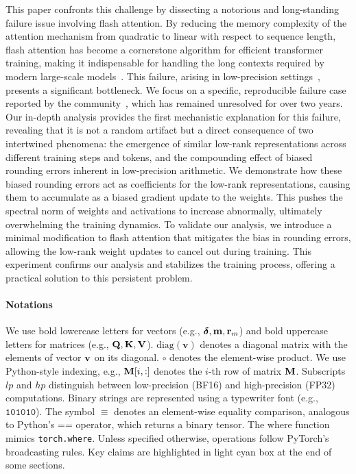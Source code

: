 \documentclass{article} %
\begin{document}
This paper confronts this challenge by dissecting a notorious and long-standing failure issue involving flash attention. By reducing the memory complexity of the attention mechanism from quadratic to linear with respect to sequence length, flash attention has become a cornerstone algorithm for efficient transformer training, making it indispensable for handling the long contexts required by modern large-scale models~\citep{dao2022flashattention,dao2023flashattention2,shah2024flashattention}. This failure, arising in low-precision settings~\citep{flash-attention_issue337,nanogpt_issue303,nanogpt_issue524,nanogpt_issue554,lee2024fp8,golden2024flash}, presents a significant bottleneck. We focus on a specific, reproducible failure case reported by the community~\citep{nanogpt_issue303,nanogpt_issue524}, which has remained unresolved for over two years. Our in-depth analysis provides the first mechanistic explanation for this failure, revealing that it is not a random artifact but a direct consequence of two intertwined phenomena: the emergence of similar low-rank representations across different training steps and tokens, and the compounding effect of biased rounding errors inherent in low-precision arithmetic. We demonstrate how these biased rounding errors act as coefficients for the low-rank representations, causing them to accumulate as a biased gradient update to the weights. This pushes the spectral norm of weights and activations to increase abnormally, ultimately overwhelming the training dynamics. To validate our analysis, we introduce a minimal modification to flash attention that mitigates the bias in rounding errors, allowing the low-rank weight updates to cancel out during training. This experiment confirms our analysis and stabilizes the training process, offering a practical solution to this persistent problem.

\paragraph{Notations} We use bold lowercase letters for vectors (e.g., ${\boldsymbol{\delta}}, {\mathbf{m}}, {\mathbf{r}}_m$) and bold uppercase letters for matrices (e.g., ${\mathbf{Q}}, {\mathbf{K}}, {\mathbf{V}}$). $\mathrm{diag}(\mathbf{v})$ denotes a diagonal matrix with the elements of vector ${\mathbf{v}}$ on its diagonal. $\circ$ denotes the element-wise product. We use Python-style indexing, e.g., ${\mathbf{M}}[i, :]$ denotes the $i$-th row of matrix ${\mathbf{M}}$. Subscripts $lp$ and $hp$ distinguish between low-precision (BF16) and high-precision (FP32) computations. Binary strings are represented using a typewriter font (e.g., $\mathtt{101010}$). The symbol $\equiv$ denotes an element-wise equality comparison, analogous to Python's == operator, which returns a binary tensor. The $\mathrm{where}$ function mimics \texttt{torch.where}. Unless specified otherwise, operations follow PyTorch's broadcasting rules. Key claims are highlighted in \colorbox{cyan!5!white}{light cyan box} at the end of some sections. 
\end{document}
